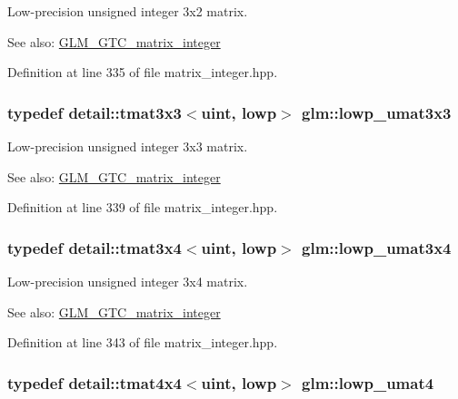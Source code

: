 Low-precision unsigned integer 3x2 matrix. \begin{Desc}
\item[See also:]\hyperlink{group__gtc__matrix__integer}{GLM\_\-GTC\_\-matrix\_\-integer} \end{Desc}


Definition at line 335 of file matrix\_\-integer.hpp.\hypertarget{group__gtc__matrix__integer_g691694b1a4c6d1e613d8f1f707acc829}{
\subsubsection[lowp\_\-umat3x3]{\setlength{\rightskip}{0pt plus 5cm}typedef detail::tmat3x3$<$uint, lowp$>$ {\bf glm::lowp\_\-umat3x3}}}
\label{group__gtc__matrix__integer_g691694b1a4c6d1e613d8f1f707acc829}


Low-precision unsigned integer 3x3 matrix. \begin{Desc}
\item[See also:]\hyperlink{group__gtc__matrix__integer}{GLM\_\-GTC\_\-matrix\_\-integer} \end{Desc}


Definition at line 339 of file matrix\_\-integer.hpp.\hypertarget{group__gtc__matrix__integer_gd44577fcaebad47da39cc244566d7fe3}{
\subsubsection[lowp\_\-umat3x4]{\setlength{\rightskip}{0pt plus 5cm}typedef detail::tmat3x4$<$uint, lowp$>$ {\bf glm::lowp\_\-umat3x4}}}
\label{group__gtc__matrix__integer_gd44577fcaebad47da39cc244566d7fe3}


Low-precision unsigned integer 3x4 matrix. \begin{Desc}
\item[See also:]\hyperlink{group__gtc__matrix__integer}{GLM\_\-GTC\_\-matrix\_\-integer} \end{Desc}


Definition at line 343 of file matrix\_\-integer.hpp.\hypertarget{group__gtc__matrix__integer_g571dcc0328ddd1d8c54eba047b5bfa2f}{
\subsubsection[lowp\_\-umat4]{\setlength{\rightskip}{0pt plus 5cm}typedef detail::tmat4x4$<$uint, lowp$>$ {\bf glm::lowp\_\-umat4}}}
\label{group__gtc__matrix__integer_g571dcc0328ddd1d8c54eba047b5bfa2f}


